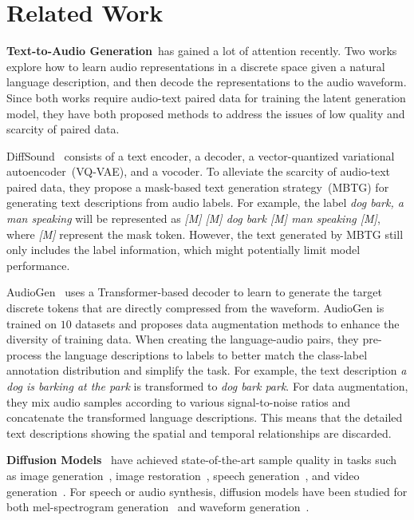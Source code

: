     
    

\section{Related Work}
\label{Background}

\label{TTA}

\textbf{Text-to-Audio Generation}~has gained a lot of attention recently. Two works~\cite{yang2022diffsound,kreuk2022audiogen} explore how to learn audio representations in a discrete space given a natural language description, and then decode the representations to the audio waveform. Since both works require audio-text paired data for training the latent generation model, they have both proposed methods to address the issues of low quality and scarcity of paired data.

DiffSound~\cite{yang2022diffsound} consists of a text encoder, a decoder, a vector-quantized variational autoencoder~(VQ-VAE), and a vocoder. To alleviate the scarcity of audio-text paired data, they propose a mask-based text generation strategy~(MBTG) for generating text descriptions from audio labels. For example, the label \textit{dog bark, a man speaking} will be represented as \textit{[M] [M] dog bark [M] man speaking [M]}, where \textit{[M]} represent the mask token. However, the text generated by MBTG still only includes the label information, which might potentially limit model performance. 

AudioGen~\cite{kreuk2022audiogen} uses a Transformer-based decoder to learn to generate the target discrete tokens that are directly compressed from the waveform. AudioGen is trained on $10$ datasets and proposes data augmentation methods to enhance the diversity of training data. When creating the language-audio pairs, they pre-process the language descriptions to labels to better match the class-label annotation distribution and simplify the task. For example, 
the text description \textit{a dog is barking at the park} is transformed to \textit{dog bark park}. For data augmentation, they mix audio samples according to various signal-to-noise ratios and concatenate the transformed language descriptions. This means that the detailed text descriptions showing the spatial and temporal relationships are discarded.

\textbf{Diffusion Models}~\cite{DDPM, SGM} have achieved state-of-the-art sample quality in tasks such as image generation~\cite{DiffusionBeatsGANs, DALLE2, Imagen}, image restoration~\cite{ISRIR}, speech generation~\cite{WaveGrad, DiffWave, leng2022binauralgrad}, and video generation~\cite{MakeAVideo, ImagenVideo}. For speech or audio synthesis, diffusion models have been studied for both mel-spectrogram generation~\cite{Grad-TTS, ResGrad} and waveform generation~\cite{BDDM, PriorGrad, InferGrad}. 

